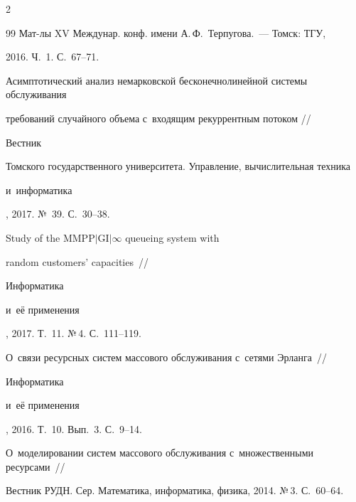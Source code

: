 \begin{multicols}{2}
{{\begin{thebibliography}{99}
{Мат-лы XV Междунар. конф. имени А.\,Ф.~Терпугова}.~--- Томск: ТГУ, 


2016. Ч.~1. С.~67--71.











Асимптотический анализ немарковской бесконечнолинейной сис\-те\-мы обслуживания 


требований случайного объема с~входящим рекуррентным потоком // {Вестник 


Томского государственного университета. Управление, вычислительная техника 


и~информатика}, 2017. №~39. С.~30--38.











Study of the $\mathrm{MMPP}|\mathrm{GI}|\infty$ queueing system with 


random customers' capacities~// 


{Информатика 


и~её применения}, 2017. Т.~11. №\,4. С.~111--119.

















О~связи ресурсных сис\-тем массового обслуживания с~сетями Эрланга~// {Информатика 


и~её применения}, 2016. Т.~10. Вып.~3. С.~9--14.











О~моделировании сис\-тем массового обслуживания с~множественными ресурсами~// 


{Вестник РУДН. Сер. Математика, информатика, физика}, 2014. №\,3. С.~60--64.






\end{thebibliography}}}
\end{multicols}
